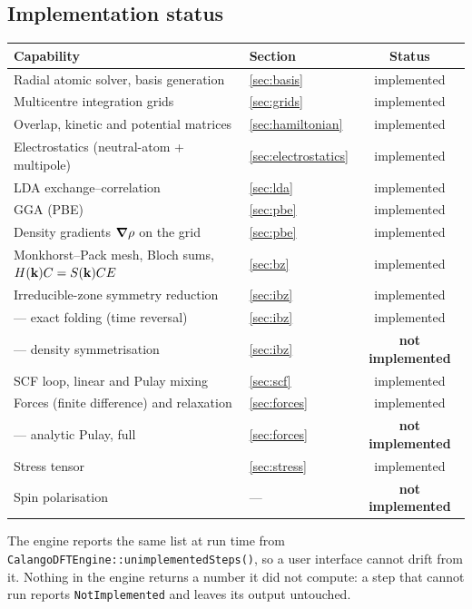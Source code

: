 \documentclass[11pt,a4paper]{article}
\newcommand{\opt}[1]{\texttt{#1}}
\begin{document}
\subsection{Implementation status}

\begin{center}
\small
\begin{tabular}{@{}llc@{}}
\toprule
Capability & Section & Status \\
\midrule
Radial atomic solver, basis generation & \ref{sec:basis} & implemented \\
Multicentre integration grids & \ref{sec:grids} & implemented \\
Overlap, kinetic and potential matrices & \ref{sec:hamiltonian} & implemented \\
Electrostatics (neutral-atom + multipole) & \ref{sec:electrostatics} & implemented \\
LDA exchange--correlation & \ref{sec:lda} & implemented \\
GGA (PBE) & \ref{sec:pbe} & implemented \\
Density gradients $\grad\rho$ on the grid & \ref{sec:pbe} & implemented \\
Monkhorst--Pack mesh, Bloch sums, $H(\vb{k})C = S(\vb{k})CE$ & \ref{sec:bz} & implemented \\
Irreducible-zone symmetry reduction & \ref{sec:ibz} & implemented \\
\quad --- exact folding (time reversal) & \ref{sec:ibz} & implemented \\
\quad --- density symmetrisation & \ref{sec:ibz} & \textbf{not implemented} \\
SCF loop, linear and Pulay mixing & \ref{sec:scf} & implemented \\
Forces (finite difference) and relaxation & \ref{sec:forces} & implemented \\
\quad --- analytic Pulay, full & \ref{sec:forces} & \textbf{not implemented} \\
Stress tensor & \ref{sec:stress} & implemented \\
Spin polarisation & --- & \textbf{not implemented} \\
\bottomrule
\end{tabular}
\end{center}

\noindent
The engine reports the same list at run time from
\opt{CalangoDFTEngine::unimplementedSteps()}, so a user interface cannot drift
from it. Nothing in the engine returns a number it did not compute: a step
that cannot run reports \opt{NotImplemented} and leaves its output untouched.
\end{document}
